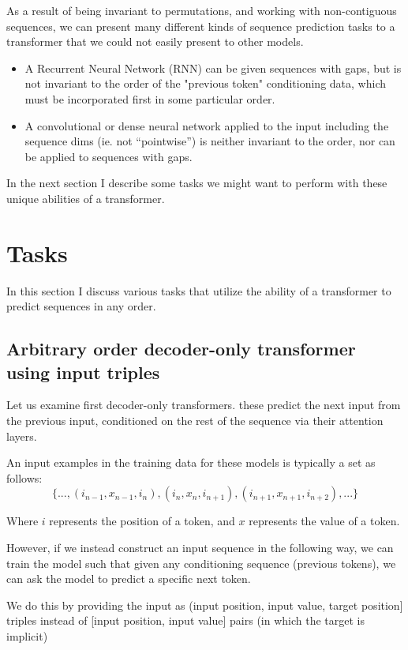 As a result of being invariant to permutations, and working with non-contiguous sequences, we can present many different kinds of sequence prediction tasks to a transformer that we could not easily present to other models.

\begin{itemize}
    \item A Recurrent Neural Network (RNN) can be given sequences with gaps, but is not invariant to the order of the "previous token" conditioning data, which must be incorporated first in some particular order.
    \item A convolutional or dense neural network applied to the input including the sequence dims (ie. not ``pointwise'') is neither invariant to the order, nor can be applied to sequences with gaps.
\end{itemize}

In the next section I describe some tasks we might want to perform with these unique abilities of a transformer.

\section{Tasks}
\label{s:order-tasks}

In this section I discuss various tasks that utilize the ability of a transformer to predict sequences in any order.

\subsection{Arbitrary order decoder-only transformer using input triples}
\label{ss:decoder-only-triples}

Let us examine first decoder-only transformers. these predict the next input from the previous input, conditioned on the rest of the sequence via their attention layers.

An input examples in the training data for these models is typically a set as follows:
$$
   \{ ..., (i_{n-1}, x_{n-1}, i_{n}), (i_{n}, x_{n}, i_{n+1}), (i_{n+1}, x_{n+1}, i_{n+2}), ... \}
$$

Where $i$ represents the position of a token, and $x$ represents the value of a token.

However, if we instead construct an input sequence in the following way, we can train the model such that given any conditioning sequence (previous tokens), we can ask the model to predict a specific next token.

We do this by providing the input as (input position, input value, target position] triples instead of [input position, input value] pairs (in which the target is implicit)

